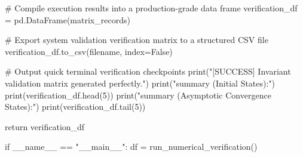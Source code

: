     # Compile execution results into a production-grade data frame
    verification_df = pd.DataFrame(matrix_records)
   
    # Export system validation verification matrix to a structured CSV file
    verification_df.to_csv(filename, index=False)
   
    # Output quick terminal verification checkpoints
    print("[SUCCESS] Invariant validation matrix generated perfectly.")
    print("\nHead summary (Initial States):")
    print(verification_df.head(5))
    print("\nTail summary (Asymptotic Convergence States):")
    print(verification_df.tail(5))
   
    return verification_df

if __name__ == "__main__":
    df = run_numerical_verification()
